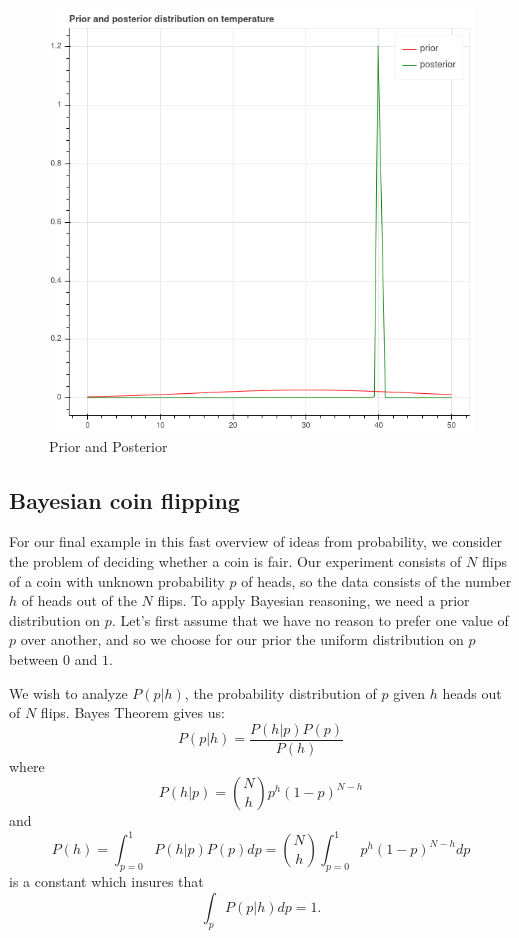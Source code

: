 \documentclass[
  oneside]{scrbook}
\begin{document}
\begin{figure}
\hypertarget{fig:comparison}{%
\centering
\includegraphics{img/priorposterior.png}
\caption{Prior and Posterior}\label{fig:comparison}
}
\end{figure}

\hypertarget{bayesian-coin-flipping}{%
\subsection{Bayesian coin flipping}\label{bayesian-coin-flipping}}

For our final example in this fast overview of ideas from probability,
we consider the problem of deciding whether a coin is fair. Our
experiment consists of \(N\) flips of a coin with unknown probability
\(p\) of heads, so the data consists of the number \(h\) of heads out of
the \(N\) flips. To apply Bayesian reasoning, we need a prior
distribution on \(p\). Let's first assume that we have no reason to
prefer one value of \(p\) over another, and so we choose for our prior
the uniform distribution on \(p\) between \(0\) and \(1\).

We wish to analyze \(P(p|h)\), the probability distribution of \(p\)
given \(h\) heads out of \(N\) flips. Bayes Theorem gives us: \[
P(p|h) = \frac{P(h|p)P(p)}{P(h)}
\] where \[
P(h|p) = \binom{N}{h}p^{h}(1-p)^{N-h}
\] and \[
P(h)=\int_{p=0}^{1} P(h|p)P(p) dp = \binom{N}{h}\int_{p=0}^{1} p^{h}(1-p)^{N-h}dp
\] is a constant which insures that \[\int_{p}P(p|h)dp=1.\]
\end{document}
